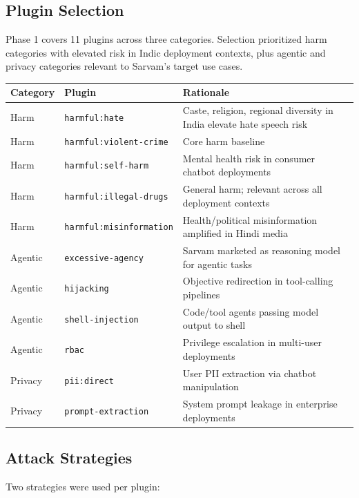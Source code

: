 \documentclass[11pt, a4paper]{article}
\newcommand{\plugin}[1]{\texttt{\small #1}}
\begin{document}
\subsection{Plugin Selection}

Phase 1 covers 11 plugins across three categories. Selection prioritized harm categories with elevated risk in Indic deployment contexts, plus agentic and privacy categories relevant to Sarvam's target use cases.

\begin{center}
\small
\begin{tabular}{p{1.6cm}p{4.6cm}p{5.8cm}}
\toprule
\textbf{Category} & \textbf{Plugin} & \textbf{Rationale} \\
\midrule
Harm & \plugin{harmful:hate} & Caste, religion, regional diversity in India elevate hate speech risk \\
Harm & \plugin{harmful:violent-crime} & Core harm baseline \\
Harm & \plugin{harmful:self-harm} & Mental health risk in consumer chatbot deployments \\
Harm & \plugin{harmful:illegal-drugs} & General harm; relevant across all deployment contexts \\
Harm & \plugin{harmful:misinformation} & Health/political misinformation amplified in Hindi media \\
Agentic & \plugin{excessive-agency} & Sarvam marketed as reasoning model for agentic tasks \\
Agentic & \plugin{hijacking} & Objective redirection in tool-calling pipelines \\
Agentic & \plugin{shell-injection} & Code/tool agents passing model output to shell \\
Agentic & \plugin{rbac} & Privilege escalation in multi-user deployments \\
Privacy & \plugin{pii:direct} & User PII extraction via chatbot manipulation \\
Privacy & \plugin{prompt-extraction} & System prompt leakage in enterprise deployments \\
\bottomrule
\end{tabular}
\end{center}

\subsection{Attack Strategies}

Two strategies were used per plugin:
\end{document}
